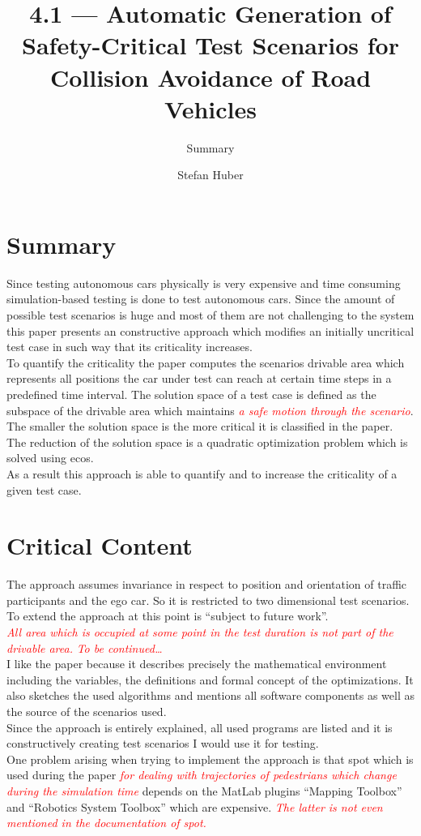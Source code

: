 \documentclass[oneside, notitlepage, twocolumn]{scrartcl}
\title{\LARGE 4.1 --- Automatic Generation of Safety-Critical Test Scenarios for Collision Avoidance of Road Vehicles}
\subtitle{Summary}
\author{Stefan Huber}
\newcommand{\draft}[1]{\textcolor{red}{\textit{#1}}}
\begin{document}
\maketitle

\section{Summary}
Since testing autonomous cars physically is very expensive and time consuming simulation-based testing is done to test autonomous cars.
Since the amount of possible test scenarios is huge and most of them are not challenging to the system this paper presents an constructive approach which modifies an initially uncritical test case in such way that its criticality increases.\\
To quantify the criticality the paper computes the scenarios drivable area which represents all positions the car under test can reach at certain time steps in a predefined time interval.
The solution space of a test case is defined as the subspace of the drivable area which maintains \draft{a safe motion through the scenario}.
The smaller the solution space is the more critical it is classified in the paper.\\
The reduction of the solution space is a quadratic optimization problem which is solved using \gls{ecos}.\\
As a result this approach is able to quantify and to increase the criticality of a given test case.

\section{Critical Content}
The approach assumes invariance in respect to position and orientation of traffic participants and the ego car.
So it is restricted to two dimensional test scenarios.
To extend the approach at this point is ``subject to future work''.\\
\draft{%
    All area which is occupied at some point in the test duration is not part of the drivable area.
}
\draft{To be continued\ldots}\\
I like the paper because it describes precisely the mathematical environment including the variables, the definitions and formal concept of the optimizations.
It also sketches the used algorithms and mentions all software components as well as the source of the scenarios used.\\
Since the approach is entirely explained, all used programs are listed and it is constructively creating test scenarios I would use it for testing.\\
One problem arising when trying to implement the approach is that \gls{spot} which is used during the paper \draft{for dealing with trajectories of pedestrians which change during the simulation time} depends on the MatLab plugins ``Mapping Toolbox'' and ``Robotics System Toolbox'' which are expensive.
\draft{The latter is not even mentioned in the documentation of \gls{spot}.}
\end{document}
